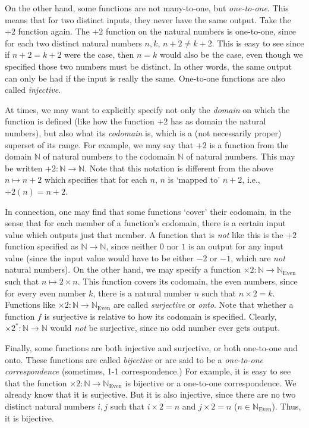 On the other hand, some functions are not many-to-one, but \textit{one-to-one}. This means that for two distinct inputs, they never have the same output. Take the $+2$ function again. The $+2$ function on the natural numbers is one-to-one, since for each two distinct natural numbers $n, k$, $n+2\neq k+2$. This is easy to see since if $n+2=k+2$ were the case, then $n=k$ would also be the case, even though we specified those two numbers must be distinct. In other words, the same output can only be had if the input is really the same. One-to-one functions are also called \textit{injective}. 

At times, we may want to explicitly specify not only the \textit{domain} on which the function is defined (like how the function $+2$ has as domain the natural numbers), but also what its \textit{codomain} is, which is a (not necessarily proper) superset of its range. For example, we may say that $+2$ is a function from the domain $\mathbb{N}$ of natural numbers to the codomain $\mathbb{N}$ of natural numbers. This may be written $+2: \mathbb{N} \to \mathbb{N}$. Note that this notation is different from the above $n \mapsto n+2$ which specifies that for each $n$, $n$ is `mapped to' $n+2$, i.e., $+2(n)=n+2$. 

In connection, one may find that some functions `cover' their codomain, in the sense that for each member of a function's codomain, there is a certain input value which outputs just that member. A function that is \textit{not} like this is the $+2$ function specified as $\mathbb{N} \to \mathbb{N}$, since neither $0$ nor $1$ is an output for any input value (since the input value would have to be either $-2$ or $-1$, which are \textit{not} natural numbers). On the other hand, we may specify a function $\times2: \mathbb{N} \to \mathbb{N}_\text{Even}$ such that $n \mapsto 2\times n$. This function covers its codomain, the even numbers, since for every even number $k$, there is a natural number $n$ such that $n \times 2=k$. Functions like $\times 2: \mathbb{N} \to \mathbb{N}_\text{Even}$ are called \textit{surjective} or \textit{onto}. Note that whether a function $f$ is surjective is relative to how its codomain is specified. Clearly, $\times 2^*: \mathbb{N} \to \mathbb{N}$ would \textit{not} be surjective, since no odd number ever gets output. 

Finally, some functions are both injective and surjective, or both one-to-one and onto. These functions are called \textit{bijective} or are said to be a \textit{one-to-one correspondence} (sometimes, 1-1 correspondence.) For example, it is easy to see that the function $\times2: \mathbb{N}\to \mathbb{N}_\text{Even}$ is bijective or a one-to-one correspondence. We already know that it is surjective. But it is also injective, since there are no two distinct natural numbers $i, j$ such that $i\times 2=n$ and $j\times 2=n$ ($n \in \mathbb{N}_\text{Even}$). Thus, it is bijective. 


